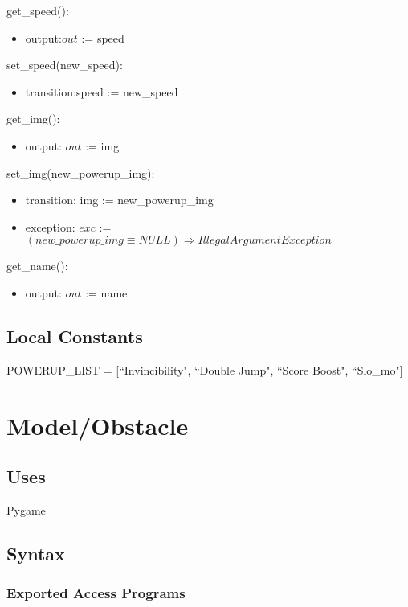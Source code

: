 \documentclass[12pt]{article}
\begin{document}
\noindent get\_speed():
\begin{itemize}
    \item output:$out$ := speed
\end{itemize}


\noindent set\_speed(new\_speed):
\begin{itemize}
    \item transition:speed := new\_speed
\end{itemize}


\noindent get\_img():
\begin{itemize}
    \item output: $out$ := img 
\end{itemize}


\noindent set\_img(new\_powerup\_img):
\begin{itemize}
    \item transition: img := new\_powerup\_img
    \item exception: $exc$ := $(new\_powerup\_img \equiv NULL) \Rightarrow IllegalArgumentException$
\end{itemize}

\noindent get\_name():
\begin{itemize}
    \item output: $out$ := name
\end{itemize}

\subsection*{Local Constants}
POWERUP\_LIST = [``Invincibility", ``Double Jump", ``Score Boost", ``Slo\_mo"]
\newpage

\section*{Model/Obstacle}

\subsection* {Uses}
Pygame


\subsection* {Syntax}

\subsubsection* {Exported Access Programs}
\end{document}
